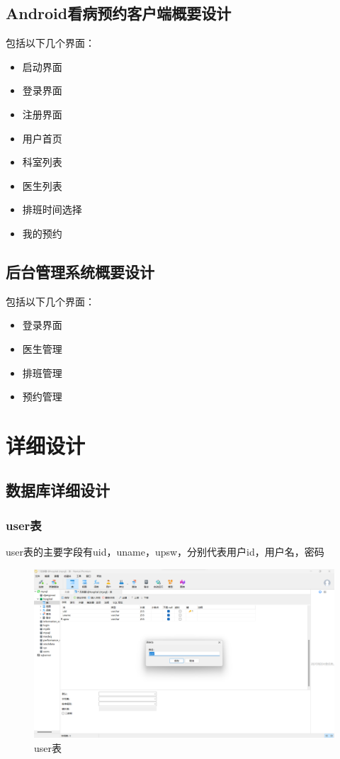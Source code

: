 \documentclass[UTF8,12pt]{article}
\begin{document}
\subsection{Android看病预约客户端概要设计}
包括以下几个界面：
\begin{itemize}
    \item 启动界面
    \item 登录界面
    \item 注册界面
    \item 用户首页
    \item 科室列表
    \item 医生列表
    \item 排班时间选择
    \item 我的预约
\end{itemize}

\subsection{后台管理系统概要设计}
包括以下几个界面：
\begin{itemize}
    \item 登录界面
    \item 医生管理
    \item 排班管理
    \item 预约管理
\end{itemize}

\newpage

\section{详细设计}

\subsection{数据库详细设计}

\subsubsection{user表}
user表的主要字段有uid，uname，upsw，分别代表用户id，用户名，密码

\begin{figure}[htbp]
    \centering
    \includegraphics[width=1.0\textwidth]{imgs/5.png}
    \caption{user表}
\end{figure}
\end{document}
